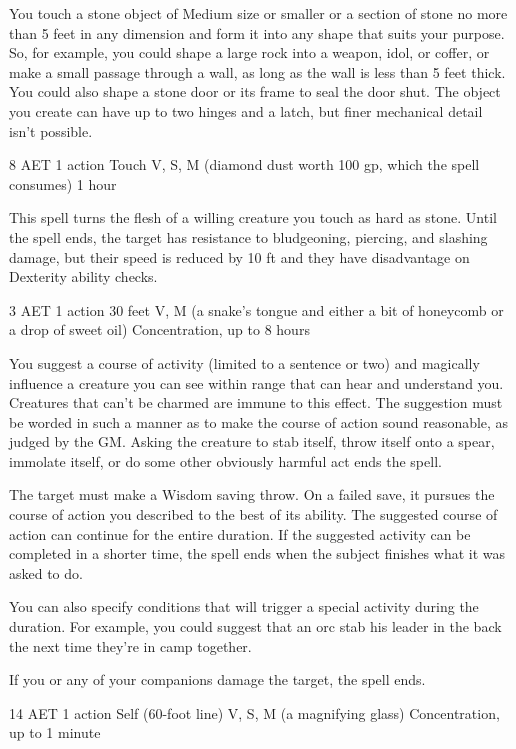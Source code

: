 You touch a stone object of Medium size or smaller or a section of stone no more than 5 feet in any dimension and form it into any shape that suits your purpose. So, for example, you could shape a large rock into a weapon, idol, or coffer, or make a small passage through a wall, as long as the wall is less than 5 feet thick. You could also shape a stone door or its frame to seal the door shut. The object you create can have up to two hinges and a latch, but finer mechanical detail isn't possible.


{8 AET}
{1 action}
{Touch}
{V, S, M (diamond dust worth 100 gp, which the spell consumes)}
{1 hour}

This spell turns the flesh of a willing creature you touch as hard as stone. Until the spell ends, the target has resistance to bludgeoning, piercing, and slashing damage, but their speed is reduced by 10 ft and they have disadvantage on Dexterity ability checks.


{3 AET}
{1 action}
{30 feet}
{V, M (a snake's tongue and either a bit of honeycomb or a drop of sweet oil)}
{Concentration, up to 8 hours}

You suggest a course of activity (limited to a sentence or two) and magically influence a creature you can see within range that can hear and understand you. Creatures that can't be charmed are immune to this effect. The suggestion must be worded in such a manner as to make the course of action sound reasonable, as judged by the GM. Asking the creature to stab itself, throw itself onto a spear, immolate itself, or do some other obviously harmful act ends the spell.

The target must make a Wisdom saving throw. On a failed save, it pursues the course of action you described to the best of its ability. The suggested course of action can continue for the entire duration. If the suggested activity can be completed in a shorter time, the spell ends when the subject finishes what it was asked to do.

You can also specify conditions that will trigger a special activity during the duration. For example, you could suggest that an orc stab his leader in the back the next time they're in camp together.

If you or any of your companions damage the target, the spell ends.


{14 AET}
{1 action}
{Self (60-foot line)}
{V, S, M (a magnifying glass)}
{Concentration, up to 1 minute}

